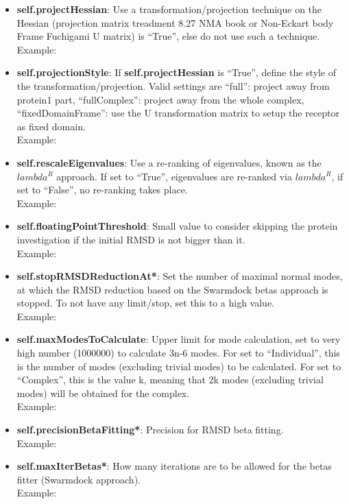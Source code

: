 \documentclass[11pt]{article}
\begin{document}
\begin{itemize}
\item \textbf{self.projectHessian}: Use a transformation/projection technique on the Hessian (projection matrix treadment 8.27 NMA book or Non-Eckart body Frame Fuchigami U matrix) is ``True'', else do not use such a technique. \\ 
Example: 

\item \textbf{self.projectionStyle}: If \textbf{self.projectHessian} is ``True'', define the style of the transformation/projection. Valid settings are ``full'': project away from protein1 part, ``fullComplex'': project away from the whole complex, ``fixedDomainFrame'': use the U transformation matrix to setup the receptor as fixed domain. \\
Example: 

\item \textbf{self.rescaleEigenvalues}: Use a re-ranking of eigenvalues, known as the $lambda^{R}$ approach. 
If set to ``True'', eigenvalues are re-ranked via $lambda^{R}$, if set to ``False'', no re-ranking takes place.  \\ 
Example: 

\item \textbf{self.floatingPointThreshold}: Small value to consider skipping the protein investigation if the initial RMSD is not bigger than it. \\
Example: 

\item \textbf{self.stopRMSDReductionAt*}: Set the number of maximal normal modes, at which the RMSD reduction based on the Swarmdock betas approach is stopped. To not have any limit/stop, set this to a high value. \\
Example: 

\item \textbf{self.maxModesToCalculate}: Upper limit for mode calculation, set to very high number (1000000) to calculate 3n-6 modes. For \textbf{} set to ``Individual'', this is the number of modes (excluding trivial modes) to be calculated. For \textbf{} set to ``Complex'', this is the value k, meaning that 2k modes (excluding trivial modes) will be obtained for the complex. \\        
Example: 

\item \textbf{self.precisionBetaFitting*}: Precision for RMSD beta fitting. \\
Example: 

\item \textbf{self.maxIterBetas*}: How many iterations are to be allowed for the betas fitter (Swarmdock approach). \\
Example: 
\end{itemize}
\end{document}
